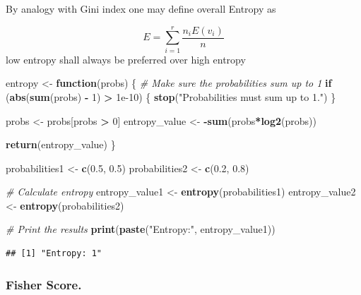 \documentclass[a4paper,conference]{IEEEtran}
\newenvironment{Shaded}{\begin{snugshade}}{\end{snugshade}}
\newcommand{\CommentTok}[1]{\textcolor[rgb]{0.56,0.35,0.01}{\textit{#1}}}
\newcommand{\ControlFlowTok}[1]{\textcolor[rgb]{0.13,0.29,0.53}{\textbf{#1}}}
\newcommand{\DecValTok}[1]{\textcolor[rgb]{0.00,0.00,0.81}{#1}}
\newcommand{\FloatTok}[1]{\textcolor[rgb]{0.00,0.00,0.81}{#1}}
\newcommand{\FunctionTok}[1]{\textcolor[rgb]{0.13,0.29,0.53}{\textbf{#1}}}
\newcommand{\NormalTok}[1]{#1}
\newcommand{\OtherTok}[1]{\textcolor[rgb]{0.56,0.35,0.01}{#1}}
\newcommand{\SpecialCharTok}[1]{\textcolor[rgb]{0.81,0.36,0.00}{\textbf{#1}}}
\newcommand{\StringTok}[1]{\textcolor[rgb]{0.31,0.60,0.02}{#1}}
\begin{document}
By analogy with Gini index one may define overall Entropy as

\[ E = \sum_{i=1}^{r} \frac{n_iE(v_i)}{n} \] low entropy shall always be
preferred over high entropy

\begin{Shaded}
\begin{Highlighting}[]
\NormalTok{entropy }\OtherTok{\textless{}{-}} \ControlFlowTok{function}\NormalTok{(probs) \{}
  \CommentTok{\# Make sure the probabilities sum up to 1}
  \ControlFlowTok{if}\NormalTok{ (}\FunctionTok{abs}\NormalTok{(}\FunctionTok{sum}\NormalTok{(probs) }\SpecialCharTok{{-}} \DecValTok{1}\NormalTok{) }\SpecialCharTok{\textgreater{}} \FloatTok{1e{-}10}\NormalTok{) \{}
    \FunctionTok{stop}\NormalTok{(}\StringTok{"Probabilities must sum up to 1."}\NormalTok{)}
\NormalTok{  \}}

\NormalTok{  probs }\OtherTok{\textless{}{-}}\NormalTok{ probs[probs }\SpecialCharTok{\textgreater{}} \DecValTok{0}\NormalTok{]}
\NormalTok{  entropy\_value }\OtherTok{\textless{}{-}} \SpecialCharTok{{-}}\FunctionTok{sum}\NormalTok{(probs}\SpecialCharTok{*}\FunctionTok{log2}\NormalTok{(probs))}

  \FunctionTok{return}\NormalTok{(entropy\_value)}
\NormalTok{\}}

\NormalTok{probabilities1 }\OtherTok{\textless{}{-}} \FunctionTok{c}\NormalTok{(}\FloatTok{0.5}\NormalTok{, }\FloatTok{0.5}\NormalTok{) }
\NormalTok{probabilities2 }\OtherTok{\textless{}{-}} \FunctionTok{c}\NormalTok{(}\FloatTok{0.2}\NormalTok{, }\FloatTok{0.8}\NormalTok{)}

\CommentTok{\# Calculate entropy}
\NormalTok{entropy\_value1 }\OtherTok{\textless{}{-}} \FunctionTok{entropy}\NormalTok{(probabilities1)}
\NormalTok{entropy\_value2 }\OtherTok{\textless{}{-}} \FunctionTok{entropy}\NormalTok{(probabilities2)}

\CommentTok{\# Print the results}
\FunctionTok{print}\NormalTok{(}\FunctionTok{paste}\NormalTok{(}\StringTok{"Entropy:"}\NormalTok{, entropy\_value1))}
\end{Highlighting}
\end{Shaded}

\begin{verbatim}
## [1] "Entropy: 1"
\end{verbatim}

\hypertarget{sec:fisher-score.}{%
\subsubsection{Fisher Score.}\label{sec:fisher-score.}}
\end{document}
